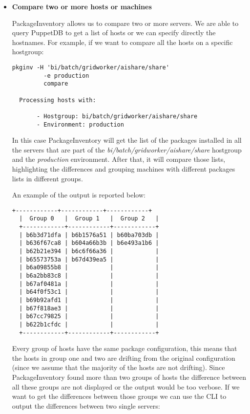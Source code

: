 \begin{itemize}
  \item \textbf{Compare two or more hosts or machines}

  PackageInventory allows us to compare two or more servers. We are able
  to query PuppetDB to get a list of hosts or we can specify directly the
  hostnames. For example, if we want to compare all the hosts on
  a specific hostgroup: \newline{}
  
  \begin{lstlisting}[frame=single]
  pkginv -H 'bi/batch/gridworker/aishare/share'
         -e production
         compare
  
  Processing hosts with:
  
       - Hostgroup: bi/batch/gridworker/aishare/share
       - Environment: production
  \end{lstlisting}

  In this case PackageInventory will get the list of the packages
  installed in all the servers that are part of the
  \textit{bi/batch/gridworker/aishare/share} hostgroup and the
  \textit{production} environment. After that, it will compare those
  lists, highlighting the differences and grouping machines with different
  packages lists in different groups.

  An example of the output is reported below: \newline{}

  \begin{lstlisting}[frame=single]
  +------------+------------+------------+
  |  Group 0   |  Group 1   |  Group 2   |
  +------------+------------+------------+
  | b6b3d71dfa | b6b1576a51 | b60ba703db |
  | b636f67ca8 | b604a66b3b | b6e493a1b6 |
  | b62b21e394 | b6c6f66a36 |            |
  | b65573753a | b67d439ea5 |            |
  | b6a09855b8 |            |            |
  | b6a2bb83c8 |            |            |
  | b67af0481a |            |            |
  | b64f0f53c1 |            |            |
  | b69b92afd1 |            |            |
  | b67f818ae3 |            |            |
  | b67cc79825 |            |            |
  | b622b1cfdc |            |            |
  +------------+------------+------------+
  \end{lstlisting}

  Every group of hosts have the same package configuration, this means
  that the hosts in group one and two are drifting from the original
  configuration (since we assume that the majority of the hosts are not
  drifting). Since PackageInventory found more than two groups of hosts
  the difference between all these groups are not displayed or the output
  would be too verbose. If we want to get the differences between those
  groups we can use the CLI to output the differences between two single
  servers: \newline{}


\end{itemize}
